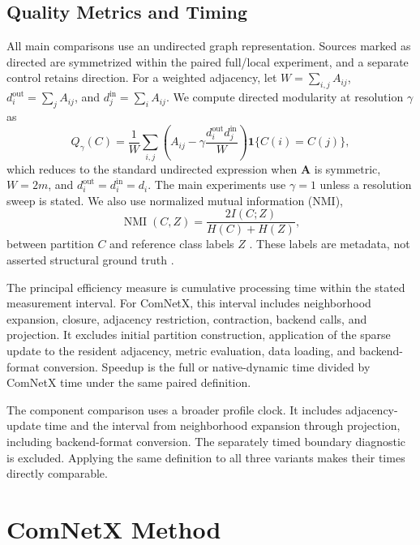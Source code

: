 \documentclass{ieeeaccess}
\begin{document}
\subsection{Quality Metrics and Timing}

All main comparisons use an undirected graph representation. Sources marked as
directed are symmetrized within the paired full/local experiment, and a
separate control retains direction. For a weighted adjacency, let
$W=\sum_{i,j}A_{ij}$,
$d_i^{\mathrm{out}}=\sum_jA_{ij}$, and
$d_j^{\mathrm{in}}=\sum_iA_{ij}$. We compute directed modularity at resolution
$\gamma$ as
\begin{equation}
Q_\gamma(C)=\frac{1}{W}\sum_{i,j}
\left(A_{ij}-\gamma\frac{d_i^{\mathrm{out}}d_j^{\mathrm{in}}}{W}\right)
\mathbf{1}\{C(i)=C(j)\},
\label{eq:modularity}
\end{equation}
which reduces to the standard undirected expression when $\bm{A}$ is symmetric,
$W=2m$, and $d_i^{\mathrm{out}}=d_i^{\mathrm{in}}=d_i$. The main experiments
use $\gamma=1$ unless a resolution sweep is stated. We also use normalized
mutual information (NMI),
\begin{equation}
\operatorname{NMI}(C,Z)=\frac{2I(C;Z)}{H(C)+H(Z)},
\label{eq:nmi}
\end{equation}
between partition $C$ and reference class labels $Z$
\cite{Danon2005}. These labels are metadata, not asserted structural ground
truth \cite{Peel2017}.

The principal efficiency measure is cumulative processing time within the
stated measurement interval. For ComNetX, this interval includes
neighborhood expansion, closure, adjacency restriction, contraction, backend
calls, and projection. It excludes initial partition construction, application
of the sparse update to the resident adjacency, metric evaluation, data loading,
and backend-format conversion. Speedup is the full or native-dynamic time
divided by ComNetX time under the same paired definition.

The component comparison uses a broader profile clock. It includes
adjacency-update time and the interval from neighborhood expansion through projection,
including backend-format conversion. The separately timed boundary diagnostic
is excluded. Applying the same definition to all three variants makes their
times directly comparable.

\section{ComNetX Method}
\label{sec:method}
\end{document}
